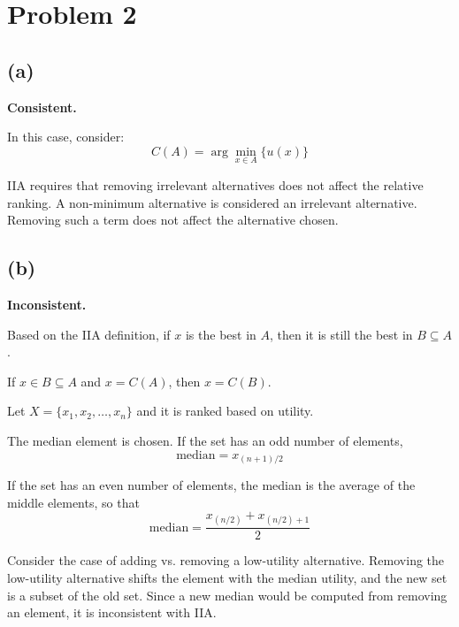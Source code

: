 \documentclass{article}
\begin{document}
\section*{Problem 2} %


\subsection*{(a)}
\textbf{Consistent.}

In this case, consider:
\[
C(A) = \arg\min_{x \in A} \{ u(x) \}
\]

IIA requires that removing irrelevant alternatives does not affect the relative ranking. A non-minimum alternative is considered an irrelevant alternative. Removing such a term does not affect the alternative chosen.


\subsection*{(b)}
\textbf{Inconsistent.}

Based on the IIA definition, if \(x\) is the best in \(A\), then it is still the best in \(B \subseteq A\).

If \(x \in B \subseteq A\) and \(x = C(A)\), then \(x = C(B)\).

Let \(X = \{x_1, x_2, \ldots, x_n\}\) and it is ranked based on utility.

The median element is chosen.  
If the set has an odd number of elements,  
\[
\text{median} = x_{(n+1)/2}
\]

If the set has an even number of elements,  
the median is the average of the middle elements, so that
\[
\text{median} = \frac{x_{(n/2)} + x_{(n/2)+1}}{2}
\]

Consider the case of adding vs. removing a low-utility alternative.  
Removing the low-utility alternative shifts the element with the median utility, and the new set is a subset of the old set.   
Since a new median would be computed from removing an element, it is inconsistent with IIA.
\end{document}
